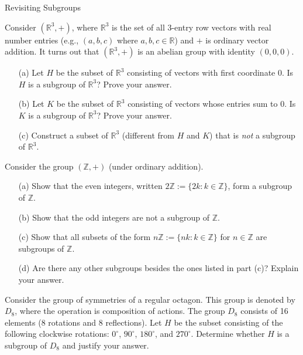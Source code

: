 \begin{section}{Revisiting Subgroups}
\begin{exercise}
Consider \((\mathbb{R}^3,+)\), where \(\mathbb{R}^3\) is the set of all 3-entry row vectors with real number entries (e.g., \((a,b,c)\) where \(a,b,c\in\mathbb{R}\)) and \(+\) is ordinary vector addition.  It turns out that \((\mathbb{R}^3,+)\) is an abelian group with identity \((0,0,0)\).  
\begin{enumerate}
\item[(a)] Let \(H\) be the subset of \(\mathbb{R}^3\) consisting of vectors with first coordinate 0.  Is \(H\) is a subgroup of \(\mathbb{R}^3\)?  Prove your answer.
\item[(b)] Let \(K\) be the subset of \(\mathbb{R}^3\) consisting of vectors whose entries sum to 0.  Is \(K\) is a subgroup of \(\mathbb{R}^3\)?  Prove your answer.
\item[(c)] Construct a subset of \(\mathbb{R}^3\) (different from \(H\) and \(K\)) that is \emph{not} a subgroup of \(\mathbb{R}^3\).
\end{enumerate}
\end{exercise}

\begin{exercise}\label{exer:nZ}
Consider the group \((\mathbb{Z},+)\) (under ordinary addition).
\begin{enumerate}
\item[(a)] Show that the even integers, written \(2\mathbb{Z}:=\{2k:k\in\mathbb{Z}\}\), form a subgroup of \(\mathbb{Z}\).
\item[(b)] Show that the odd integers are not a subgroup of \(\mathbb{Z}\).
\item[(c)] Show that all subsets of the form \(n\mathbb{Z}:=\{nk:k\in\mathbb{Z}\}\) for \(n\in\mathbb{Z}\) are subgroups of \(\mathbb{Z}\).
\item[(d)] Are there any other subgroups besides the ones listed in part (c)?  Explain your answer.
\end{enumerate}
\end{exercise}

\begin{exercise}
Consider the group of symmetries of a regular octagon.  This group is denoted by \(D_8\), where the operation is composition of actions.  The group \(D_8\) consists of 16 elements (8 rotations and 8 reflections).  Let \(H\) be the subset consisting of the following clockwise rotations: \(0^\circ\), \(90^\circ\), \(180^\circ\), and \(270^\circ\).  Determine whether \(H\) is a subgroup of \(D_8\) and justify your answer.
\end{exercise}


\end{section}
